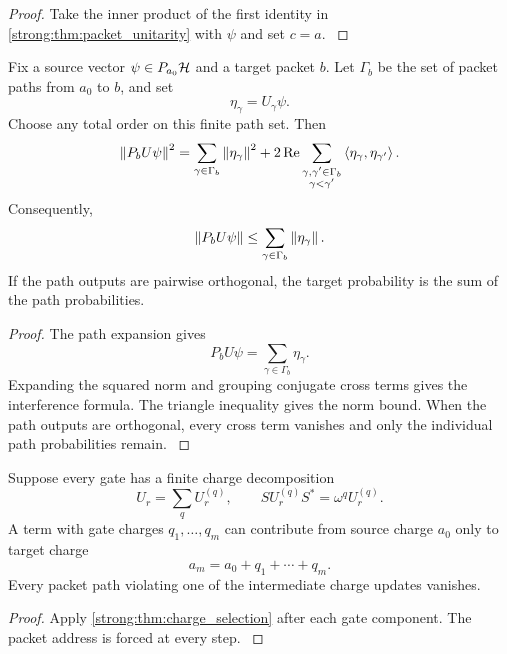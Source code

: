 \begin{proof}\label{strong:proof:014}
Take the inner product of the first identity in \cref{strong:thm:packet_unitarity} with \(\psi\) and set \(c=a\).
\label{strong:proof:014:end}\end{proof}

\begin{theorem}\label{strong:theorem:009}\label{strong:thm:path_interference}
Fix a source vector \(\psi\in P_{a_0}\Hcal\) and a target packet \(b\). Let \(\Gamma_b\) be the set of packet paths from \(a_0\) to \(b\), and set
\[
\eta_\gamma=U_\gamma\psi.
\]
Choose any total order on this finite path set. Then
\[
\left\lVert P_bU\psi\right\rVert^2
=
\sum_{\gamma\in\Gamma_b}\left\lVert\eta_\gamma\right\rVert^2
+
2\operatorname{Re}
\sum_{\substack{\gamma,\gamma'\in\Gamma_b\\ \gamma<\gamma'}}
\left\langle\eta_\gamma,\eta_{\gamma'}\right\rangle.
\]
Consequently,
\[
\left\lVert P_bU\psi\right\rVert
\leq
\sum_{\gamma\in\Gamma_b}\left\lVert\eta_\gamma\right\rVert.
\]
If the path outputs are pairwise orthogonal, the target probability is the sum of the path probabilities.
\end{theorem}

\begin{proof}\label{strong:proof:015}
The path expansion gives
\[
P_bU\psi=\sum_{\gamma\in\Gamma_b}\eta_\gamma.
\]
Expanding the squared norm and grouping conjugate cross terms gives the interference formula. The triangle inequality gives the norm bound. When the path outputs are orthogonal, every cross term vanishes and only the individual path probabilities remain.
\label{strong:proof:015:end}\end{proof}

\begin{proposition}\label{strong:proposition:002}\label{strong:prop:charge_pruning}
Suppose every gate has a finite charge decomposition
\[
U_r=\sum_qU_r^{(q)},
\qquad
SU_r^{(q)}S^*=\omega^qU_r^{(q)}.
\]
A term with gate charges \(q_1,\ldots,q_m\) can contribute from source charge \(a_0\) only to target charge
\[
a_m=a_0+q_1+\cdots+q_m.
\]
Every packet path violating one of the intermediate charge updates vanishes.
\end{proposition}

\begin{proof}\label{strong:proof:016}
Apply \cref{strong:thm:charge_selection} after each gate component. The packet address is forced at every step.
\label{strong:proof:016:end}\end{proof}

